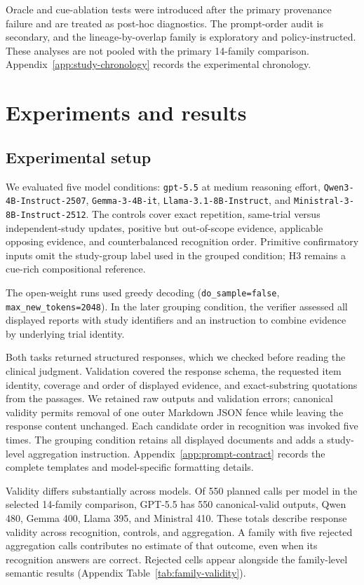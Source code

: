 \documentclass[11pt]{article}
\begin{document}
Oracle and cue-ablation tests were introduced after the primary provenance failure and are treated as post-hoc diagnostics. The prompt-order audit is secondary, and the lineage-by-overlap family is exploratory and policy-instructed. These analyses are not pooled with the primary 14-family comparison. Appendix~\ref{app:study-chronology} records the experimental chronology.



\section{Experiments and results}
\label{sec:results}

\subsection{Experimental setup}

We evaluated five model conditions: \texttt{gpt-5.5} at medium reasoning effort, \texttt{Qwen3-4B-Instruct-2507}, \texttt{Gemma-3-4B-it}, \texttt{Llama-3.1-8B-Instruct}, and \texttt{Ministral-3-8B-Instruct-2512}. The controls cover exact repetition, same-trial versus independent-study updates, positive but out-of-scope evidence, applicable opposing evidence, and counterbalanced recognition order. Primitive confirmatory inputs omit the study-group label used in the grouped condition; H3 remains a cue-rich compositional reference.

The open-weight runs used greedy decoding (\texttt{do\_sample=false}, \texttt{max\_new\_tokens=2048}). In the later grouping condition, the verifier assessed all displayed reports with study identifiers and an instruction to combine evidence by underlying trial identity.

Both tasks returned structured responses, which we checked before reading the clinical judgment. Validation covered the response schema, the requested item identity, coverage and order of displayed evidence, and exact-substring quotations from the passages. We retained raw outputs and validation errors; canonical validity permits removal of one outer Markdown JSON fence while leaving the response content unchanged. Each candidate order in recognition was invoked five times. The grouping condition retains all displayed documents and adds a study-level aggregation instruction. Appendix~\ref{app:prompt-contract} records the complete templates and model-specific formatting details.

Validity differs substantially across models. Of 550 planned calls per model in the selected 14-family comparison, GPT-5.5 has 550 canonical-valid outputs, Qwen 480, Gemma 400, Llama 395, and Ministral 410. These totals describe response validity across recognition, controls, and aggregation. A family with five rejected aggregation calls contributes no estimate of that outcome, even when its recognition answers are correct. Rejected cells appear alongside the family-level semantic results (Appendix Table~\ref{tab:family-validity}).
\end{document}
